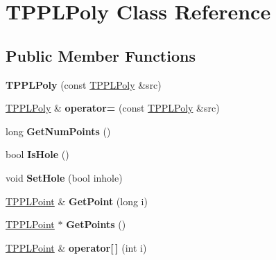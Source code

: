 \hypertarget{class_t_p_p_l_poly}{}\section{T\+P\+P\+L\+Poly Class Reference}
\label{class_t_p_p_l_poly}
\subsection*{Public Member Functions}
\begin{DoxyCompactItemize}
\item 
\mbox{\label{class_t_p_p_l_poly_a3f596c26476e58bc4325adfe0de676e9}} 
{\bfseries T\+P\+P\+L\+Poly} (const \mbox{\hyperlink{class_t_p_p_l_poly}{T\+P\+P\+L\+Poly}} \&src)
\item 
\mbox{\label{class_t_p_p_l_poly_a330662b894f6e97003115a52fb4f663c}} 
\mbox{\hyperlink{class_t_p_p_l_poly}{T\+P\+P\+L\+Poly}} \& {\bfseries operator=} (const \mbox{\hyperlink{class_t_p_p_l_poly}{T\+P\+P\+L\+Poly}} \&src)
\item 
\mbox{\label{class_t_p_p_l_poly_a034d433867faf07fdabe37182aa81a00}} 
long {\bfseries Get\+Num\+Points} ()
\item 
\mbox{\label{class_t_p_p_l_poly_a25fcdb60b1135a6acbebc95efed42112}} 
bool {\bfseries Is\+Hole} ()
\item 
\mbox{\label{class_t_p_p_l_poly_a60ecad9b8039e2d514ff28fb1ac9db55}} 
void {\bfseries Set\+Hole} (bool inhole)
\item 
\mbox{\label{class_t_p_p_l_poly_a27d4a3287547dbe510014a242f510f2c}} 
\mbox{\hyperlink{struct_t_p_p_l_point}{T\+P\+P\+L\+Point}} \& {\bfseries Get\+Point} (long i)
\item 
\mbox{\label{class_t_p_p_l_poly_a60427e8a8989635b96f7cc72b734fb91}} 
\mbox{\hyperlink{struct_t_p_p_l_point}{T\+P\+P\+L\+Point}} $\ast$ {\bfseries Get\+Points} ()
\item 
\mbox{\label{class_t_p_p_l_poly_ae20dd18c02b0b35ece8c81176869542d}} 
\mbox{\hyperlink{struct_t_p_p_l_point}{T\+P\+P\+L\+Point}} \& {\bfseries operator\mbox{[}$\,$\mbox{]}} (int i)

\end{DoxyCompactItemize}
